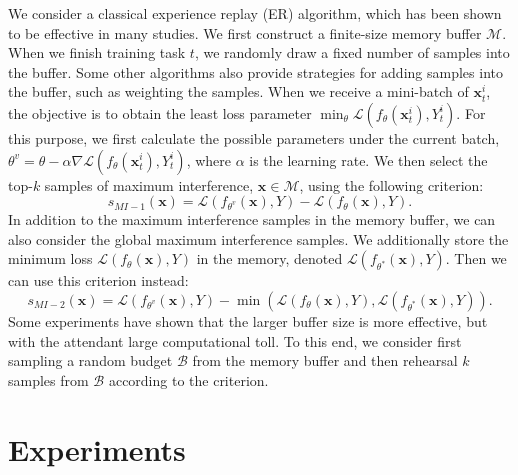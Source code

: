 \documentclass{article} %
\begin{document}
We consider a classical experience replay (ER) algorithm, which has been shown to be effective in many studies\citep{ArslanChaudhry2019ContinualLW}.
We first construct a finite-size memory buffer $\mathcal{M}$. When we finish training task $t$, we randomly draw a fixed number of samples into the buffer. Some other algorithms also provide strategies for adding samples into the buffer, such as weighting the samples\citep{RahafAljundi2019GradientBS,GTSperl2016iCaRLIC}.
When we receive a mini-batch of $\boldsymbol{x}_t^i$, the objective is to obtain the least loss parameter $\min_\theta \mathcal{L}(f_\theta(\boldsymbol{x}_t^i), Y_t^i)$.
For this purpose, we first calculate the possible parameters under the current batch, $\theta^v = \theta - \alpha \nabla \mathcal{L}(f_\theta(\boldsymbol{x}_t^i), Y_t^i)$, where $\alpha$ is the learning rate.
We then select the top-$k$ samples of maximum interference, $\boldsymbol{x} \in \mathcal{M}$, using the following criterion:
\begin{equation}
    s_{MI-1}(\boldsymbol{x}) = \mathcal{L}(f_{\theta^v}(\boldsymbol{x}), Y) - \mathcal{L}(f_{\theta}(\boldsymbol{x}), Y).
\end{equation}
In addition to the maximum interference samples in the memory buffer, we can also consider the global maximum interference samples. 
We additionally store the minimum loss $\mathcal{L}(f_\theta(\boldsymbol{x}), Y)$ in the memory, denoted $\mathcal{L}(f_{\theta^*}(\boldsymbol{x}), Y)$.
Then we can use this criterion instead:
\begin{equation}
    s_{MI-2}(\boldsymbol{x}) = \mathcal{L}(f_{\theta^v}(\boldsymbol{x}), Y) - \min(\mathcal{L}(f_\theta (\boldsymbol{x}), Y), \mathcal{L}(f_{\theta^*}(\boldsymbol{x}), Y)).
\end{equation}
Some experiments have shown that the larger buffer size is more effective, but with the attendant large computational toll\citep{MIR}. 
To this end, we consider first sampling a random budget $\mathcal{B}$ from the memory buffer and then rehearsal $k$ samples from $\mathcal{B}$ according to the criterion.

\section{Experiments}
\end{document}
